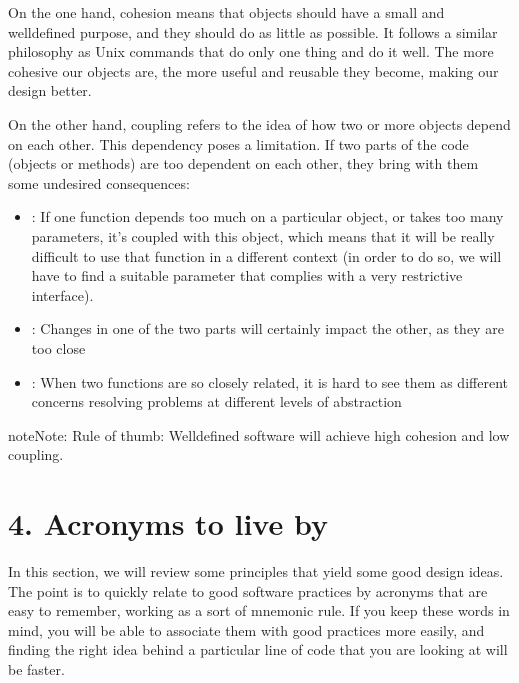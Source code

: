 \documentclass[a4paper,10pt,english]{sphinxmanual}
\begin{document}
On the one hand, cohesion means that objects should have a small and well\sphinxhyphen{}defined purpose, and they should do
as little as possible. It follows a similar philosophy as Unix commands that do only one thing and do it well.
The more cohesive our objects are, the more useful and reusable they become, making our design better.

On the other hand, coupling refers to the idea of how two or more objects depend on each other. This
dependency poses a limitation. If two parts of the code (objects or methods) are too dependent on each other,
they bring with them some undesired consequences:
\begin{itemize}
\item {} 
: If one function depends too much on a particular object, or takes too many parameters, it’s coupled with this object, which means that it will be really difficult to use that function in a different context (in order to do so, we will have to find a suitable parameter that complies with a very restrictive interface).

\item {} 
: Changes in one of the two parts will certainly impact the other, as they are too close

\item {} 
: When two functions are so closely related, it is hard to see them as different concerns resolving problems at different levels of abstraction

\end{itemize}

\begin{sphinxadmonition}{note}{Note:}
Rule of thumb: Well\sphinxhyphen{}defined software will achieve high cohesion and low coupling.
\end{sphinxadmonition}


\section{4. Acronyms to live by}
\label{\detokenize{chapters/3_general_traits/index:acronyms-to-live-by}}
In this section, we will review some principles that yield some good design ideas. The point is to quickly
relate to good software practices by acronyms that are easy to remember, working as a sort of mnemonic rule.
If you keep these words in mind, you will be able to associate them with good practices more easily, and
finding the right idea behind a particular line of code that you are looking at will be faster.
\end{document}
